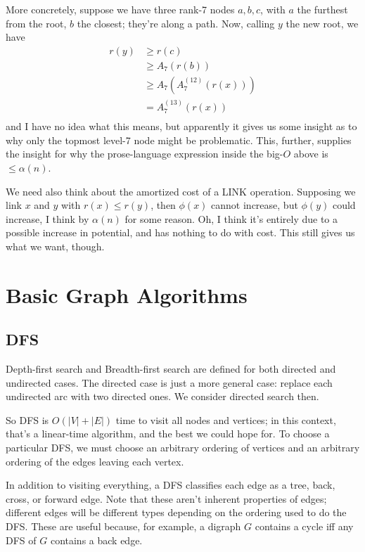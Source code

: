\documentclass{article}
\begin{document}
More concretely, suppose we have three rank-7 nodes $a,b,c$, with 
$a$ the furthest from the root, $b$ the closest; they're along a path.
Now, calling $y$ the new root, we have
\begin{align*}
	r(y) &\geq r(c) \\
&	\geq A_7(r(b)) \\
	&\geq A_7(A_7^{(12)}(r(x))) \\
	&= A_7^{(13)}(r(x)) \\
\end{align*}
and I have no idea what this means, but apparently it gives us some
insight as to why only the topmost level-7 node might be problematic.
This, further, supplies the insight for why the prose-language expression
inside the big-$O$ above is $\leq\alpha(n)$.

We need also think about the amortized cost of a LINK operation.
Supposing we link $x$ and $y$ with $r(x) \leq r(y)$, then $\phi(x)$ cannot
increase, but $\phi(y)$ could increase, I think by $\alpha(n)$ for some
reason.
Oh, I think it's entirely due to a possible increase in potential, and has
nothing to do with cost.
This still gives us what we want, though.



\section{Basic Graph Algorithms}

\subsection{DFS}

Depth-first search and Breadth-first search are defined for both directed
and undirected cases.
The directed case is just a more general case: replace each undirected
arc with two directed ones.
We consider directed search then.

So DFS is $O(|V| + |E|)$ time to visit all nodes and vertices; in this context,
that's a linear-time algorithm, and the best we could hope for.
To choose a particular DFS, we must choose an arbitrary ordering of vertices 
and an arbitrary ordering of the edges leaving each vertex.

In addition to visiting everything, a DFS classifies each edge
as a tree, back, cross, or forward edge. Note that these aren't inherent
properties of edges; different edges will be different types depending
on the ordering used to do the DFS.
These are useful because, for example, a digraph $G$ contains
a cycle iff any DFS of $G$ contains a back edge.
\end{document}
